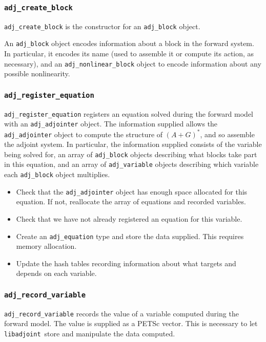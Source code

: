 \documentclass[10pt,authoryear]{elsarticle}
\newcommand{\libadjoint}[0]{{\texttt{libadjoint}}}
\begin{document}
\subsubsection{\texttt{{adj\_create\_block}}}
\texttt{adj\_create\_block} is the constructor for an \texttt{adj\_block} object. 

An \texttt{adj\_block} object encodes information about a block in the forward system. In particular, it encodes its name
(used to assemble it or compute its action, as necessary), and an \texttt{adj\_nonlinear\_block} object to encode 
information about any possible nonlinearity.

\subsubsection{\texttt{{adj\_register\_equation}}}
\texttt{adj\_register\_equation} registers an equation solved during the forward model with an \texttt{adj\_adjointer} object. 
The information supplied allows the \texttt{adj\_adjointer} object to compute the structure of $(A+G)^{*}$, and so assemble the adjoint
system. In particular, the information supplied consists of the variable being solved for, an array of \texttt{adj\_block} objects describing
what blocks take part in this equation, and an array of \texttt{adj\_variable} objects describing which variable each \texttt{adj\_block}
object multiplies.

\begin{itemize}
\item Check that the \texttt{adj\_adjointer} object has enough space allocated for this equation. If not, reallocate
the array of equations and recorded variables.
\item Check that we have not already registered an equation for this variable. 
\item Create an \texttt{adj\_equation} type and store the data supplied. This requires memory allocation.
\item Update the hash tables recording information about what targets and depends on each variable.
\end{itemize}
\subsubsection{\texttt{{adj\_record\_variable}}}
\texttt{adj\_record\_variable} records the value of a variable computed during the forward model. The value is
supplied as a PETSc vector. This is necessary to let \libadjoint\ store and manipulate the data computed.
\end{document}
